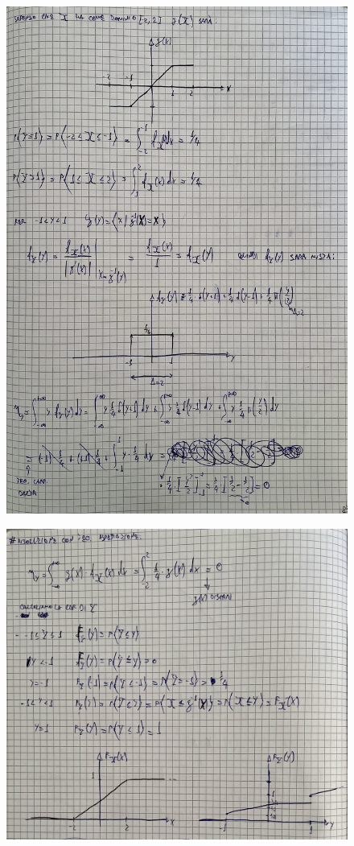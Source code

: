 \documentclass{article}
\begin{document}
\begin{figure}[ht]
\centering
\includegraphics[scale=0.20]{ese/22a.jpeg}
\end{figure}
\begin{figure}[ht]
\centering
\includegraphics[scale=0.20]{ese/22b.jpeg}
\end{figure} 
\clearpage
\end{document}
